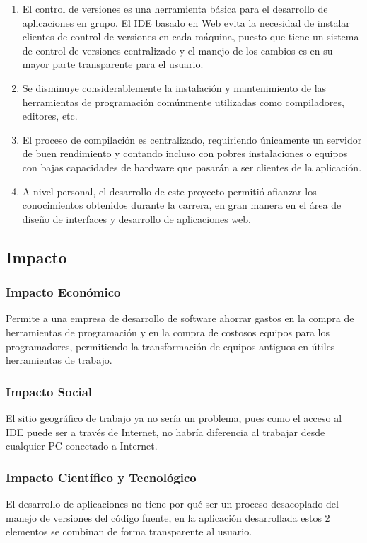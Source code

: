 \begin{enumerate}
	
	\item El control de versiones es una herramienta básica para el desarrollo de aplicaciones en grupo. El IDE basado en Web evita la necesidad de instalar clientes de control de versiones en cada máquina, puesto que tiene un sistema de control de versiones centralizado y el manejo de los cambios es en su mayor parte transparente para el usuario.
	
	\item Se disminuye considerablemente la instalación y mantenimiento de las herramientas de programación comúnmente utilizadas como compiladores, editores, etc.

	\item El proceso de compilación es centralizado, requiriendo únicamente un servidor de buen rendimiento y contando incluso con pobres instalaciones o equipos con bajas capacidades de hardware que pasarán a ser clientes de la aplicación.

	\item A nivel personal, el desarrollo de este proyecto permitió afianzar los conocimientos obtenidos durante la carrera, en gran manera en el área de diseño de interfaces y desarrollo de aplicaciones web.
	
\end{enumerate}

\subsection{Impacto}

\subsubsection{Impacto Económico}

Permite a una empresa de desarrollo de software ahorrar gastos en la compra de herramientas de programación y en la compra de costosos equipos para los programadores, permitiendo la transformación de equipos antiguos en útiles herramientas de trabajo.

\subsubsection{Impacto Social}

El sitio geográfico de trabajo ya no sería un problema, pues como el acceso al IDE puede ser a través de Internet, no habría diferencia al trabajar desde cualquier PC conectado a Internet.

\subsubsection{Impacto Científico y Tecnológico}

El desarrollo de aplicaciones no tiene por qué ser un proceso desacoplado del manejo de versiones del código fuente, en la aplicación desarrollada estos 2 elementos se combinan de forma transparente al usuario.

